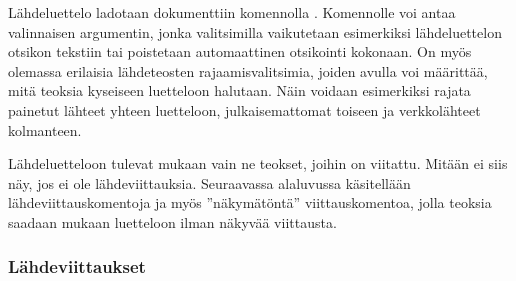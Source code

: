 \begin{koodilohkosis}



\end{koodilohkosis}

Lähdeluettelo ladotaan dokumenttiin komennolla
. Komennolle voi antaa valinnaisen
argumentin, jonka valitsimilla vaikutetaan esimerkiksi lähdeluettelon
otsikon tekstiin tai poistetaan automaattinen otsikointi kokonaan. On
myös olemassa erilaisia lähdeteosten rajaamisvalitsimia, joiden avulla
voi määrittää, mitä teoksia kyseiseen luetteloon halutaan. Näin voidaan
esimerkiksi rajata painetut lähteet yhteen luetteloon, julkaisemattomat
toiseen ja verkkolähteet kolmanteen.

\begin{koodilohkosis}
\printbibliography
\printbibliography[title={Lähteet}]
\printbibliography[heading=none,  %
  type=online]           %
\end{koodilohkosis}

Lähdeluetteloon tulevat mukaan vain ne teokset, joihin on viitattu.
Mitään ei siis näy, jos ei ole lähdeviittauksia. Seuraavassa alaluvussa
käsitellään lähdeviittauskomentoja ja myös ''näkymätöntä''
viittauskomentoa, jolla teoksia saadaan mukaan luetteloon ilman näkyvää
viittausta.

\subsubsection{Lähdeviittaukset}


